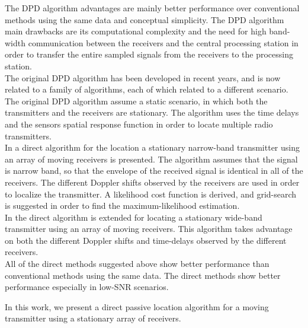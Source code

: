 The DPD algorithm advantages are mainly better performance over conventional methods using the same data and conceptual simplicity. The DPD algorithm main drawbacks are its computational complexity and the need for high band-width communication between the receivers and the central processing station in order to transfer the entire sampled signals from the receivers to the processing station.\\

The original DPD algorithm\cite{dpd} has been developed in recent years, and is now related to a family of algorithms, each of which related to a different scenario.
The original DPD algorithm \cite{dpd} assume a static scenario, in which both the transmitters and the receivers are stationary. The algorithm uses the time delays and the sensors spatial response function in order to locate multiple radio transmitters.\\

In \cite{dop_dpd_nb} a direct algorithm for the location a stationary narrow-band transmitter using an array of moving receivers is presented. The algorithm assumes that the signal is narrow band, so that the envelope of the received signal is identical in all of the receivers. The different Doppler shifts observed by the receivers are used in order to localize the transmitter. A likelihood cost function is derived, and grid-search is suggested in order to find the maximum-likelihood estimation.\\

In \cite{dop_dpd_wb} the direct algorithm is extended for locating a stationary wide-band transmitter using an array of moving receivers. This algorithm takes advantage on both the different Doppler shifts and time-delays observed by the different receivers.\\

All of the direct methods suggested above show better performance than conventional methods using the same data. The direct methods show better performance especially in low-SNR scenarios. 

In this work, we present a direct passive location algorithm for a moving transmitter using a stationary array of receivers.

